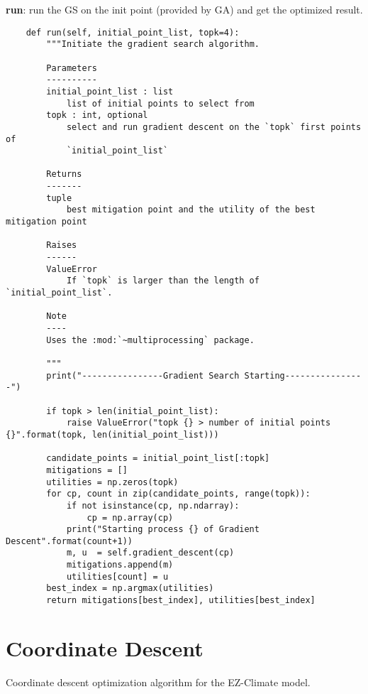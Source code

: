 \documentclass[12pt]{article}
\begin{document}
\textbf{run}: run the GS on the init point (provided by GA) and get the optimized result.
\begin{verbatim}
	def run(self, initial_point_list, topk=4):
		"""Initiate the gradient search algorithm.

		Parameters
		----------
		initial_point_list : list
			list of initial points to select from
		topk : int, optional
			select and run gradient descent on the `topk` first points of
			`initial_point_list`

		Returns
		-------
		tuple
			best mitigation point and the utility of the best mitigation point

		Raises
		------
		ValueError
			If `topk` is larger than the length of `initial_point_list`.

		Note
		----
		Uses the :mod:`~multiprocessing` package.

		"""
		print("----------------Gradient Search Starting----------------")
		
		if topk > len(initial_point_list):
			raise ValueError("topk {} > number of initial points {}".format(topk, len(initial_point_list)))

		candidate_points = initial_point_list[:topk]
		mitigations = []
		utilities = np.zeros(topk)
		for cp, count in zip(candidate_points, range(topk)):
			if not isinstance(cp, np.ndarray):
				cp = np.array(cp)
			print("Starting process {} of Gradient Descent".format(count+1))
			m, u  = self.gradient_descent(cp)
			mitigations.append(m)
			utilities[count] = u
		best_index = np.argmax(utilities)
		return mitigations[best_index], utilities[best_index]
\end{verbatim}

\section{Coordinate Descent}
Coordinate descent optimization algorithm for the EZ-Climate model.
\end{document}
